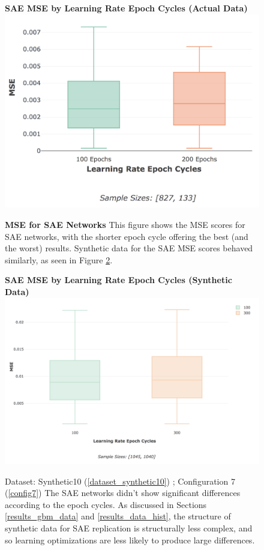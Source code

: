 \documentclass[a4paper,11pt,oneside]{article}
\theoremstyle{plain}
\theoremstyle{definition}
\begin{document}
		\begin{figure}[H]
		\centering 
		\textbf{SAE MSE by Learning Rate Epoch Cycles (Actual Data)}
		\includegraphics[scale=0.3]{images/results/network/lr/actual_mse_lr_epochs.png}
		\caption[SAE MSE by Learning Rate Epoch Cycles (Actual Data)]{\textbf{MSE for SAE Networks} 
			\newline This figure shows the MSE scores for SAE networks, with the shorter epoch cycle offering the best (and the worst) results. Synthetic data for the SAE MSE scores behaved similarly, as seen in Figure \ref{figure-synth_mse_lr_epochs}.}
		\label{figure-actual_mse_lr_epochs}
	\end{figure}%
	
		\begin{figure}[H]
		\centering 
		\textbf{SAE MSE by Learning Rate Epoch Cycles (Synthetic Data)}
		\includegraphics[scale=0.3]{images/results/network/lr/synth_mse_lr_epochs.png} 
		\caption[SAE MSE by Learning Rate Epoch Cycles (Synthetic Data)]{Dataset: Synthetic10 (\ref{dataset_synthetic10}) ; Configuration 7 (\ref{config7})
			\newline The SAE networks didn't show significant differences according to the epoch cycles. As discussed in Sections \ref{results_gbm_data} and \ref{results_data_hist}, the structure of synthetic data for SAE replication is structurally less complex, and so learning optimizations are less likely to produce large differences.}
		\label{figure-synth_mse_lr_epochs}
		\end{figure}
	
\end{document}
